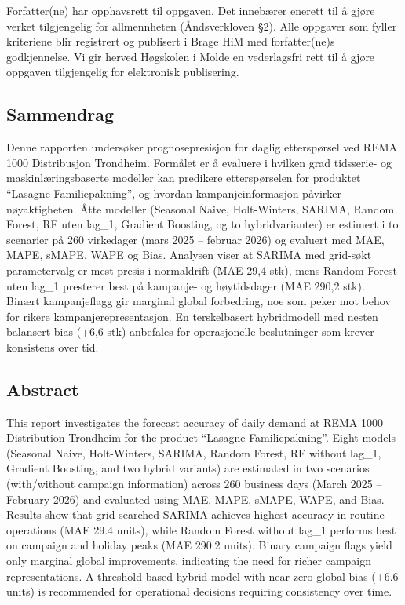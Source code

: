 \documentclass[
  norsk,
  11pt,
  a4paper,
]{article}
\begin{document}
Forfatter(ne) har opphavsrett til oppgaven. Det innebærer enerett til å
gjøre verket tilgjengelig for allmennheten (Åndsverkloven §2). Alle
oppgaver som fyller kriteriene blir registrert og publisert i Brage HiM
med forfatter(ne)s godkjennelse. Vi gir herved Høgskolen i Molde en
vederlagsfri rett til å gjøre oppgaven tilgjengelig for elektronisk
publisering.

\newpage

\subsection{Sammendrag}\label{sammendrag}

Denne rapporten undersøker prognosepresisjon for daglig etterspørsel ved
REMA 1000 Distribusjon Trondheim. Formålet er å evaluere i hvilken grad
tidsserie- og maskinlæringsbaserte modeller kan predikere etterspørselen
for produktet ``Lasagne Familiepakning'', og hvordan kampanjeinformasjon
påvirker nøyaktigheten. Åtte modeller (Seasonal Naive, Holt-Winters,
SARIMA, Random Forest, RF uten lag\_1, Gradient Boosting, og to
hybridvarianter) er estimert i to scenarier på 260 virkedager (mars 2025
-- februar 2026) og evaluert med MAE, MAPE, sMAPE, WAPE og Bias.
Analysen viser at SARIMA med grid-søkt parametervalg er mest presis i
normaldrift (MAE 29,4 stk), mens Random Forest uten lag\_1 presterer
best på kampanje- og høytidsdager (MAE 290,2 stk). Binært kampanjeflagg
gir marginal global forbedring, noe som peker mot behov for rikere
kampanjerepresentasjon. En terskelbasert hybridmodell med nesten
balansert bias (+6,6 stk) anbefales for operasjonelle beslutninger som
krever konsistens over tid.

\subsection{Abstract}\label{abstract}

This report investigates the forecast accuracy of daily demand at REMA
1000 Distribution Trondheim for the product ``Lasagne Familiepakning''.
Eight models (Seasonal Naive, Holt-Winters, SARIMA, Random Forest, RF
without lag\_1, Gradient Boosting, and two hybrid variants) are
estimated in two scenarios (with/without campaign information) across
260 business days (March 2025 -- February 2026) and evaluated using MAE,
MAPE, sMAPE, WAPE, and Bias. Results show that grid-searched SARIMA
achieves highest accuracy in routine operations (MAE 29.4 units), while
Random Forest without lag\_1 performs best on campaign and holiday peaks
(MAE 290.2 units). Binary campaign flags yield only marginal global
improvements, indicating the need for richer campaign representations. A
threshold-based hybrid model with near-zero global bias (+6.6 units) is
recommended for operational decisions requiring consistency over time.
\end{document}
